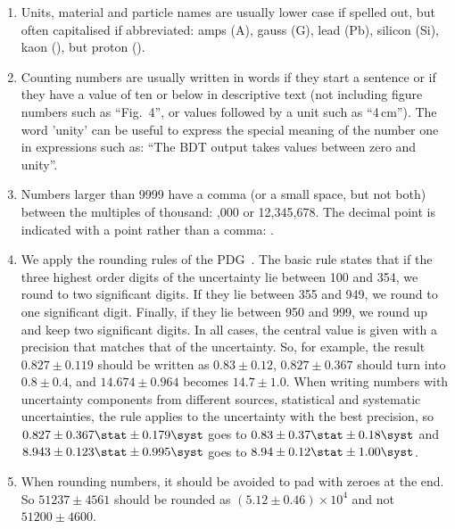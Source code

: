 \begin{enumerate}
\item Units, material and particle names are usually lower case if
  spelled out, but often capitalised if abbreviated: amps (A), gauss
  (G), lead (Pb), silicon (Si), kaon (\kaon), but proton (\proton).


\item Counting numbers are usually written in words if they start a
  sentence or if they have a value of ten or below in descriptive
  text (\ie not including figure numbers such as ``Fig.\ 4'', or
  values followed by a unit such as ``4\,cm'').
  The word 'unity' can be useful to express the special meaning of
  the number one in expressions such as: 
``The BDT output takes values between zero and unity''.

\item Numbers larger than 9999 have a comma (or a small space, but not both) between
  the multiples of thousand: ,000 or 12,345,678.  The decimal
  point is indicated with a point rather than a comma: .

\item We apply the rounding rules of the
  PDG~\cite{PDG2014}. The basic rule states that if the three
  highest order digits of the uncertainty lie between 100 and 354, we round
  to two significant digits. If they lie between 355 and 949, we round
  to one significant digit. Finally, if they lie between 950 and 999,
  we round up and keep two significant digits. In all cases,
  the central value is given with a precision that matches that of the
  uncertainty. So, for example, the result $0.827 \pm 0.119$ should be
  written as $0.83\pm 0.12$, $0.827\pm 0.367$ should turn into
  $0.8\pm 0.4$, and $14.674\pm0.964$ becomes $14.7\pm1.0$.
 When writing numbers with uncertainty components from
  different sources, \ie statistical and systematic uncertainties, the rule
  applies to the uncertainty with the best precision, so $0.827\pm
  0.367\stat\pm 0.179\syst$ goes to $0.83\pm 0.37\stat\pm 0.18\syst$ and
  $8.943\pm 0.123\stat\pm 0.995\syst$ goes to $8.94\pm 0.12\stat\pm
  1.00\syst$.

\item When rounding numbers, it should be avoided to pad with zeroes
  at the end. So $51237 \pm 4561$ should be rounded as $(5.12 \pm 0.46)
  \times 10^4$ and not $51200 \pm 4600$.


\end{enumerate}
